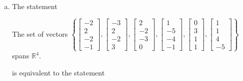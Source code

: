 \begin{exerciseAnswer}
\begin{enumerate}[(a)]
\item The statement 
\begin{center}\begin{minipage}{0.8\textwidth}
 The set of vectors \( \left\{ \left[\begin{array}{c}
-2 \\
2 \\
-2 \\
-1
\end{array}\right] , \left[\begin{array}{c}
-3 \\
2 \\
-2 \\
3
\end{array}\right] , \left[\begin{array}{c}
2 \\
-2 \\
-3 \\
0
\end{array}\right] , \left[\begin{array}{c}
1 \\
-5 \\
-4 \\
-1
\end{array}\right] , \left[\begin{array}{c}
0 \\
3 \\
1 \\
1
\end{array}\right] , \left[\begin{array}{c}
1 \\
1 \\
4 \\
-5
\end{array}\right] \right\} \) spans \(\mathbb{R}^4\). 
\end{minipage}\end{center}
     is equivalent to the statement 
\begin{center}\begin{minipage}{0.8\textwidth}
 The vector equation \( x_{1} \left[\begin{array}{c}
-2 \\
2 \\
-2 \\
-1
\end{array}\right] + x_{2} \left[\begin{array}{c}
-3 \\
2 \\

\end{array}
\end{minipage}
\end{center}
\end{enumerate}
\end{exerciseAnswer}
